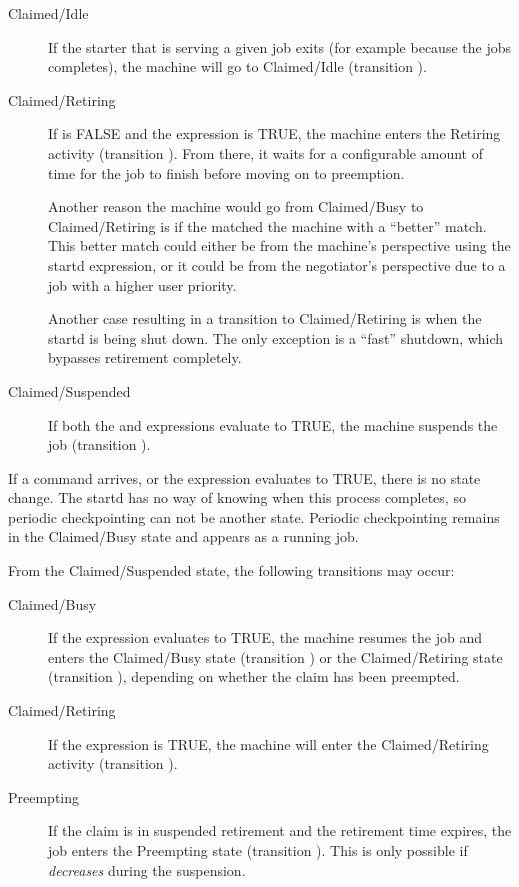 \begin{description}
  
\item[Claimed/Idle] If the starter that is serving a given job exits
  (for example because the jobs completes), the machine will go
  to Claimed/Idle (transition ).
  
\item[Claimed/Retiring] If  is FALSE and the
   expression is TRUE, the machine enters the
  Retiring activity (transition ).  From there, it
  waits for a configurable amount of time for the job to finish
  before moving on to preemption.

  Another reason the machine would go from Claimed/Busy to
  Claimed/Retiring is if the  matched the machine
  with a ``better'' match.  This better match could either be from the
  machine's perspective using the startd  expression,
  or it could be from the negotiator's perspective due to
  a job with a higher user priority.

  Another case resulting in a transition to Claimed/Retiring is when
  the startd is being shut down.  The only exception is a ``fast''
  shutdown, which bypasses retirement completely.
  
\item[Claimed/Suspended] If both the  and
   expressions evaluate to TRUE, the machine
  suspends the job (transition ).
  
\end{description}
  
If a  command arrives,
or the  expression evaluates to TRUE,
there is no state change.
The startd has no way of knowing when this process completes,
so periodic checkpointing can not be another state.
Periodic checkpointing remains in the Claimed/Busy state
and appears as a running job.

From the Claimed/Suspended state, the following transitions
may occur:

\begin{description}
  
\item[Claimed/Busy] If the  expression evaluates to
  TRUE, the machine resumes the job and enters the
  Claimed/Busy state (transition ) or the Claimed/Retiring
  state (transition ), depending on whether the claim
  has been preempted.

\item[Claimed/Retiring] If the  expression is TRUE, the machine
  will enter the Claimed/Retiring activity (transition ).

\item[Preempting] If the claim is in suspended retirement and the
  retirement time expires, the job enters the Preempting state
  (transition ).  This is only possible if
   \emph{decreases}  during the suspension.

\end{description}

